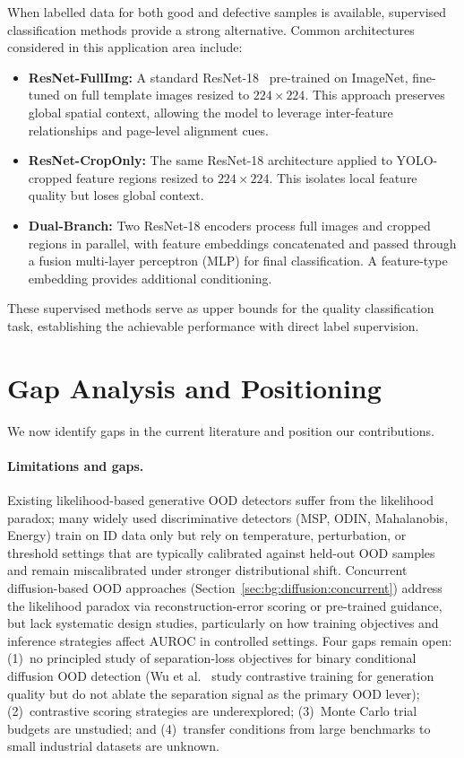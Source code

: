 When labelled data for both good and defective samples is available, supervised classification methods provide a strong alternative. Common architectures considered in this application area include:

\begin{itemize}
    \item \textbf{ResNet-FullImg:} A standard ResNet-18~\cite{he2016deep} pre-trained on ImageNet, fine-tuned on full template images resized to $224 \times 224$. This approach preserves global spatial context, allowing the model to leverage inter-feature relationships and page-level alignment cues.
    \item \textbf{ResNet-CropOnly:} The same ResNet-18 architecture applied to YOLO-cropped feature regions resized to $224 \times 224$. This isolates local feature quality but loses global context.
    \item \textbf{Dual-Branch:} Two ResNet-18 encoders process full images and cropped regions in parallel, with feature embeddings concatenated and passed through a fusion multi-layer perceptron (MLP) for final classification. A feature-type embedding provides additional conditioning.
\end{itemize}

These supervised methods serve as upper bounds for the quality classification task, establishing the achievable performance with direct label supervision.

\section{Gap Analysis and Positioning}
\label{sec:bg:gap}

We now identify gaps in the current literature and position our contributions.

\paragraph{Limitations and gaps.}
Existing likelihood-based generative OOD detectors suffer from the likelihood paradox; many widely used discriminative detectors (MSP, ODIN, Mahalanobis, Energy) train on ID data only but rely on temperature, perturbation, or threshold settings that are typically calibrated against held-out OOD samples and remain miscalibrated under stronger distributional shift. Concurrent diffusion-based OOD approaches (Section~\ref{sec:bg:diffusion:concurrent}) address the likelihood paradox via reconstruction-error scoring or pre-trained guidance, but lack systematic design studies, particularly on how training objectives and inference strategies affect AUROC in controlled settings.
Four gaps remain open: (1)~no principled study of separation-loss objectives for binary conditional diffusion OOD detection (Wu et al.~\cite{wu2024diffusion} study contrastive training for generation quality but do not ablate the separation signal as the primary OOD lever); (2)~contrastive scoring strategies are underexplored; (3)~Monte Carlo trial budgets are unstudied; and (4)~transfer conditions from large benchmarks to small industrial datasets are unknown.

